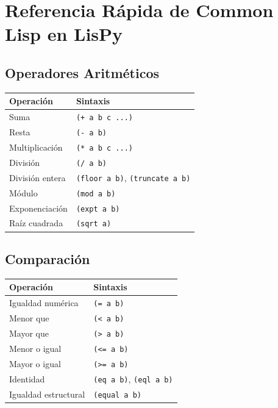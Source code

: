 \chapter{Referencia Rápida de Common Lisp en LisPy}
\label{app:quickref}

\section*{Operadores Aritméticos}

\begin{center}
\begin{tabular}{ll}
\toprule
\textbf{Operación} & \textbf{Sintaxis} \\
\midrule
Suma & \texttt{(+ a b c ...)} \\
Resta & \texttt{(- a b)} \\
Multiplicación & \texttt{(* a b c ...)} \\
División & \texttt{(/ a b)} \\
División entera & \texttt{(floor a b)}, \texttt{(truncate a b)} \\
Módulo & \texttt{(mod a b)} \\
Exponenciación & \texttt{(expt a b)} \\
Raíz cuadrada & \texttt{(sqrt a)} \\
\bottomrule
\end{tabular}
\end{center}

\section*{Comparación}

\begin{center}
\begin{tabular}{ll}
\toprule
\textbf{Operación} & \textbf{Sintaxis} \\
\midrule
Igualdad numérica & \texttt{(= a b)} \\
Menor que & \texttt{(< a b)} \\
Mayor que & \texttt{(> a b)} \\
Menor o igual & \texttt{(<= a b)} \\
Mayor o igual & \texttt{(>= a b)} \\
Identidad & \texttt{(eq a b)}, \texttt{(eql a b)} \\
Igualdad estructural & \texttt{(equal a b)} \\
\bottomrule
\end{tabular}
\end{center}

